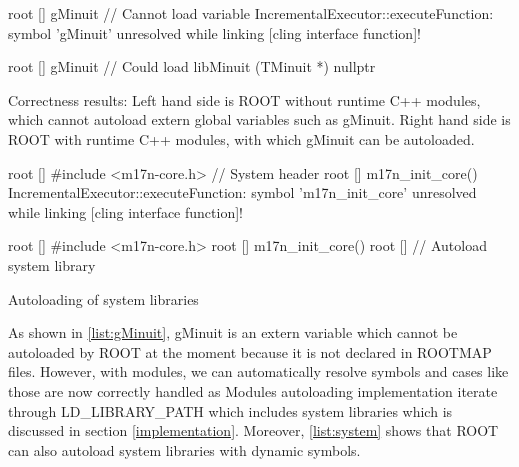 \documentclass{webofc}
\begin{document}
\begin{listing}[h]
    \noindent
    \begin{minipage}[h]{.48\textwidth}
    \begin{cppcode*}{}
root [] gMinuit // Cannot load variable
IncrementalExecutor::executeFunction:
symbol 'gMinuit' unresolved while
linking [cling interface function]!
    \end{cppcode*}
    \end{minipage}\hfill
    \begin{minipage}[h]{.48\textwidth}
    \begin{cppcode*}{}
root [] gMinuit // Could load libMinuit
(TMinuit *) nullptr
    \end{cppcode*}
    \end{minipage}
    \caption{Correctness results: Left hand side is ROOT without runtime C++ modules, which cannot autoload extern global variables such as gMinuit. Right hand side is ROOT with runtime C++ modules, with which gMinuit can be autoloaded.}
    \label{list:gMinuit}
\end{listing}

\begin{listing}[h]
    \noindent
    \begin{minipage}[h]{.48\textwidth}
    \begin{cppcode*}{}
root [] #include <m17n-core.h> // System header
root [] m17n_init_core()
IncrementalExecutor::executeFunction:
symbol 'm17n_init_core' unresolved while
linking [cling interface function]!
    \end{cppcode*}
    \end{minipage}\hfill
    \begin{minipage}[h]{.48\textwidth}
    \begin{cppcode*}{}
root [] #include <m17n-core.h>
root [] m17n_init_core()
root [] // Autoload system library
    \end{cppcode*}
    \end{minipage}
    \caption{Autoloading of system libraries}
    \label{list:system}
\end{listing}

As shown in \ref{list:gMinuit}, gMinuit is an extern variable which cannot be autoloaded by ROOT at the moment because it is not declared in ROOTMAP files. However, with modules, we can automatically resolve symbols and cases like those are now correctly handled as Modules autoloading implementation iterate through LD\_LIBRARY\_PATH which includes system libraries which is discussed in section \ref{implementation}. Moreover, \ref{list:system} shows that ROOT can also autoload system libraries with dynamic symbols.
\end{document}
